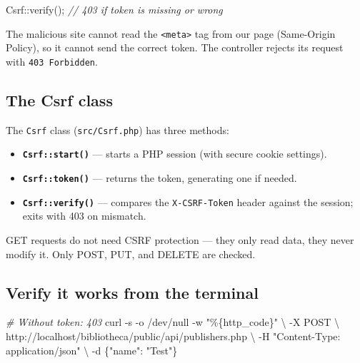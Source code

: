 \documentclass[11pt,a4paper,oneside]{book}
\newenvironment{Shaded}{\begin{snugshade}}{\end{snugshade}}
\newcommand{\DataTypeTok}[1]{\textcolor[HTML]{902000}{#1}}
\newcommand{\ConstantTok}[1]{\textcolor[HTML]{880000}{#1}}
\newcommand{\StringTok}[1]{\textcolor[HTML]{4070A0}{#1}}
\newcommand{\CommentTok}[1]{\textcolor[HTML]{60A0B0}{\textit{#1}}}
\newcommand{\OtherTok}[1]{\textcolor[HTML]{007020}{#1}}
\newcommand{\ExtensionTok}[1]{#1}
\newcommand{\AttributeTok}[1]{\textcolor[HTML]{7D9029}{#1}}
\newcommand{\NormalTok}[1]{#1}
\providecommand{\tightlist}{%
  \setlength{\itemsep}{0pt}\setlength{\parskip}{0pt}}
\begin{document}
\begin{enumerate}
\begin{Shaded}
\begin{Highlighting}[]
\ConstantTok{C}\NormalTok{srf::verify()}\OtherTok{;}  \CommentTok{// 403 if token is missing or wrong}
\end{Highlighting}
\end{Shaded}
\end{enumerate}

The malicious site cannot read the
\texttt{\textless{}meta\textgreater{}} tag from our page
(Same-Origin Policy), so it cannot send the correct token. The
controller rejects its request with \texttt{403\ Forbidden}.

\hypertarget{the-csrf-class}{%
\subsection{The Csrf class}\label{the-csrf-class}}

The \texttt{Csrf} class (\texttt{src/Csrf.php}) has three
methods:

\begin{itemize}
\tightlist
\item
  \textbf{\texttt{Csrf::start()}} --- starts a PHP session (with
  secure cookie settings).
\item
  \textbf{\texttt{Csrf::token()}} --- returns the token,
  generating one if needed.
\item
  \textbf{\texttt{Csrf::verify()}} --- compares the
  \texttt{X-CSRF-Token} header against the session; exits with
  403 on mismatch.
\end{itemize}

GET requests do not need CSRF protection --- they only read data,
they never modify it. Only POST, PUT, and DELETE are checked.

\hypertarget{verify-it-works-from-the-terminal}{%
\subsection{Verify it works from the
terminal}\label{verify-it-works-from-the-terminal}}

\begin{Shaded}
\begin{Highlighting}[]
\CommentTok{\# Without token: 403}
\ExtensionTok{curl} \AttributeTok{{-}s} \AttributeTok{{-}o}\NormalTok{ /dev/null }\AttributeTok{{-}w} \StringTok{"\%\{http\_code\}"} \DataTypeTok{\textbackslash{}}
     \AttributeTok{{-}X}\NormalTok{ POST }\DataTypeTok{\textbackslash{}}
\NormalTok{     http://localhost/bibliotheca/public/api/publishers.php }\DataTypeTok{\textbackslash{}}
     \AttributeTok{{-}H} \StringTok{"Content{-}Type: application/json"} \DataTypeTok{\textbackslash{}}
     \AttributeTok{{-}d} \StringTok{\textquotesingle{}\{"name": "Test"\}\textquotesingle{}}
\end{Highlighting}
\end{Shaded}
\end{document}

